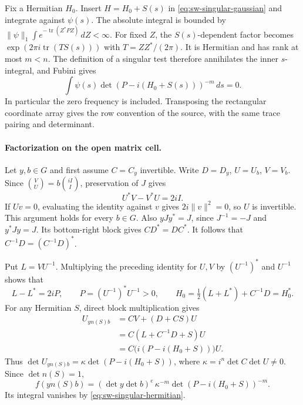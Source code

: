 Fix a Hermitian \(H_0\). Insert \(H=H_0+S(s)\) in
\eqref{eq:sw-singular-gaussian} and integrate against \(\psi(s)\).
The absolute integral is bounded by
\(\|\psi\|_1\int e^{-\operatorname{tr}(Z^*PZ)}\,dZ<\infty\).
For fixed \(Z\), the \(S(s)\)-dependent factor becomes
\(\exp(2\pi i\operatorname{tr}(T S(s)))\) with
\(T=ZZ^*/(2\pi)\). It is Hermitian and has rank at most \(m<n\).
The definition of a singular test therefore annihilates the inner
\(s\)-integral, and Fubini gives
\begin{equation}
      \int\psi(s)\det(P-i(H_0+S(s)))^{-m}\,ds=0.
 \label{eq:sw-singular-hermitian}
\end{equation}
In particular the zero frequency is included. Transposing the
rectangular coordinate array gives the row convention of the
source, with the same trace pairing and determinant.

\paragraph{Factorization on the open matrix cell.}
Let \(y,b\in G\) and first assume \(C=C_y\) invertible. Write
\(D=D_y\), \(U=U_b\), \(V=V_b\). Since
\(\binom{V}{U}=b\binom{iI}{I}\), preservation of \(J\) gives
\[
          U^*V-V^*U=2iI .
\]
If \(Uv=0\), evaluating the identity against \(v\) gives
\(2i\|v\|^2=0\), so \(U\) is invertible. This argument holds for
every \(b\in G\). Also \(yJy^*=J\), since \(J^{-1}=-J\) and
\(y^*Jy=J\). Its bottom-right block gives \(CD^*=DC^*\).
It follows that \(C^{-1}D=(C^{-1}D)^*\).

Put \(L=VU^{-1}\). Multiplying the preceding identity for \(U,V\)
by \((U^{-1})^*\) and \(U^{-1}\) shows that
\[
 L-L^*=2iP,\qquad P=(U^{-1})^*U^{-1}>0,\qquad
 H_0=\tfrac12(L+L^*)+C^{-1}D=H_0^* .
\]
For any Hermitian \(S\), direct block multiplication gives
\[
 \begin{split}
 U_{y n(S)b}
     &=CV+(D+CS)U\\
     &=C(L+C^{-1}D+S)U\\
     &=C\bigl(i(P-i(H_0+S))\bigr)U .
 \end{split}
\]
Thus
\(\det U_{y n(S)b}=\kappa\det(P-i(H_0+S))\), where
\(\kappa=i^n\det C\det U\ne0\).
Since \(\det n(S)=1\),
\[
 f(y n(S)b)
   =(\det y\det b)^e\,\kappa^{-m}\det(P-i(H_0+S))^{-m}.
\]
Its integral vanishes by \eqref{eq:sw-singular-hermitian}.

